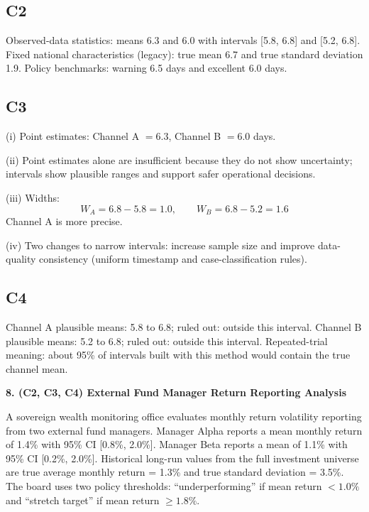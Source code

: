 \begin{ExamProblems}
		\subsection*{C2}
		Observed-data statistics: means 6.3 and 6.0 with intervals [5.8, 6.8] and [5.2, 6.8].
		Fixed national characteristics (legacy): true mean 6.7 and true standard deviation 1.9.
		Policy benchmarks: warning 6.5 days and excellent 6.0 days.
		
		\subsection*{C3}
		(i) Point estimates: Channel A $=6.3$, Channel B $=6.0$ days.
		
		(ii) Point estimates alone are insufficient because they do not show uncertainty; intervals show plausible ranges and support safer operational decisions.
		
		(iii) Widths:
		\[
		W_A=6.8-5.8=1.0,\qquad W_B=6.8-5.2=1.6
		\]
		Channel A is more precise.
		
		(iv) Two changes to narrow intervals: increase sample size and improve data-quality consistency (uniform timestamp and case-classification rules).
		
		\subsection*{C4}
		Channel A plausible means: 5.8 to 6.8; ruled out: outside this interval.
		Channel B plausible means: 5.2 to 6.8; ruled out: outside this interval.
		Repeated-trial meaning: about 95\% of intervals built with this method would contain the true channel mean.
		
		\newpage
		\item
		\textbf{8. (C2, C3, C4) External Fund Manager Return Reporting Analysis}
		
		A sovereign wealth monitoring office evaluates monthly return volatility reporting from two external fund managers.
		Manager Alpha reports a mean monthly return of 1.4\% with 95\% CI [0.8\%, 2.0\%].
		Manager Beta reports a mean of 1.1\% with 95\% CI [0.2\%, 2.0\%].
		Historical long-run values from the full investment universe are true average monthly return = 1.3\% and true standard deviation = 3.5\%.
		The board uses two policy thresholds: ``underperforming'' if mean return $<1.0\%$ and ``stretch target'' if mean return $\ge 1.8\%$.
		

\end{ExamProblems}
